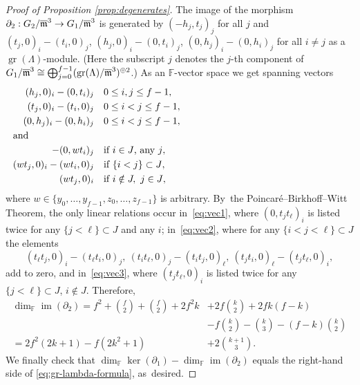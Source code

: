 \documentclass[JEP,XML,SOM,Unicode,NoFloatCountersInSection, NoEqCountersInSection,published]{cedram}
\let\ovl\overline
\newcommand{\F}{\mathbb{F}}
\DeclareMathOperator{\gr}{gr}
\DeclareMathOperator{\im}{im}
\theoremstyle{plain}
\theoremstyle{definition}
\begin{document}
\begin{proof}[Proof of Proposition \ref{prop:degenerates}]
The image of the morphism $\partial_2: G_2/\ovl\m^3 \to G_1/\ovl\m^3$ is generated by $(-h_j,t_j)_j$ for all $j$ and $(t_j,0)_i-(t_i,0)_j$, $(h_j,0)_i-(0,t_i)_j$, $(0,h_j)_i-(0,h_i)_j$ for all $i\ne j$ as a $\gr(\Lambda)$-module.
(Here the subscript $j$ denotes the $j$-th component of $G_1/\ovl\m^3\cong \bigoplus_{j=0}^{f-1} (\gr(\Lambda)/\ovl\m^3)^{\oplus 2}$.)
As an $\F$-vector space we get spanning vectors
\begin{align}
(h_j,0)_i-(0,t_i)_j &\quad 0 \le i,j \le f-1, \notag \\
(t_j,0)_i-(t_i,0)_j &\quad 0 \le i < j \le f-1, \notag \\
(0,h_j)_i-(0,h_i)_j &\quad 0 \le i < j \le f-1, \notag \\
\noalign{\noindent and}
-(0,wt_i)_j &\quad \text{if $i \in J$, any $j$}, \label{eq:vec1}\\
(wt_j,0)_i-(wt_i,0)_j &\quad \text{if $\{i < j\} \subset J$}, \label{eq:vec2} \\
(wt_j,0)_i &\quad \text{if $i \notin J,\ j \in J$} \label{eq:vec3},
\end{align}
where $w \in \{y_0,\dots,y_{f-1},z_0,\dots,z_{f-1}\}$ is arbitrary. By~the Poincaré--Birkhoff--Witt Theorem, the only linear relations occur in~\eqref{eq:vec1}, where $(0,t_j t_\ell)_i$ is listed twice for any $\{j < \ell\} \subset J$ and any $i$;
in~\eqref{eq:vec2}, where for any $\{i < j < \ell\} \subset J$ the elements
\begin{equation*}
(t_\ell t_j,0)_i-(t_\ell t_i,0)_j,\ (t_i t_\ell,0)_j-(t_i t_j,0)_\ell,\ (t_j t_i,0)_\ell-(t_j t_\ell,0)_i,
\end{equation*}
add to zero, and in~\eqref{eq:vec3}, where $(t_j t_\ell,0)_i$ is listed twice for any $\{j < \ell\} \subset J$, $i \notin J$.
Therefore,
\begin{align*}
\dim_\F \im(\partial_2) = f^2+\binom f2+\binom f2+2f^2k&+2f\binom k2+2fk(f-k)\\
&-f\binom k2-\binom k3-(f-k)\binom k2 \\
= 2f^2(2k+1)-f(2k^2+1)&+2\binom{k+1}3.
\end{align*}
We finally check that $\dim_\F \ker(\partial_1)-\dim_\F \im(\partial_2)$ equals the right-hand side of \eqref{eq:gr-lambda-formula}, as~desired.


\end{proof}
\end{document}
